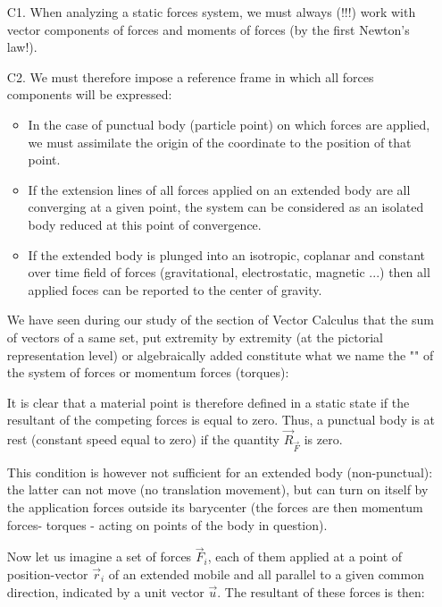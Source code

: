 	\begin{enumerate}
		\item[C1.] When analyzing a static forces system, we must always (!!!) work with vector components of forces and moments of forces (by the first Newton's law!).

		\item[C2.] We must therefore impose a reference frame in which all forces components will be expressed:
		\begin{itemize}
			\item In the case of punctual body (particle point) on which forces are applied, we must assimilate the origin of the coordinate to the position of that point.

			\item If the extension lines of all forces applied on an extended body are all converging at a given point, the system can be considered as an isolated body reduced at this point of convergence.

			\item If the extended body is plunged into an isotropic, coplanar and constant over time field of forces (gravitational, electrostatic, magnetic ...) then all applied foces can be reported to the center of gravity.
		\end{itemize}
		\begin{dem}
		We have seen during our study of the section of Vector Calculus that the sum of vectors of a  same set, put extremity by extremity (at the pictorial representation level) or algebraically added constitute what we name the "" of the system of forces or momentum forces (torques):
		
		It is clear that a material point is therefore defined in a static state if the resultant of the competing forces is equal to zero. Thus, a punctual body is at rest (constant speed equal to zero) if the quantity $\vec{R}_{\vec{F}}$ is zero.
	
		This condition is however not sufficient for an extended body (non-punctual): the latter can not move (no translation movement), but can turn on itself by the application forces outside its barycenter (the forces are then momentum forces- torques - acting on points of the body in question).
	
		Now let us imagine a set of forces $\vec{F}_i$, each of them applied at a point of position-vector $\vec{r}_i$ of an extended mobile and all parallel to a given common direction, indicated by a unit vector $\vec{u}$. The resultant of these forces is then:
		

\end{dem}
\end{enumerate}
